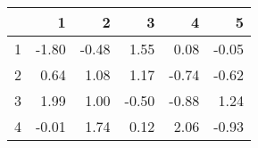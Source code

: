 \begin{table}[ht]
\centering
\begin{tabular}{rrrrrr}
  \hline
 & 1 & 2 & 3 & 4 & 5 \\ 
  \hline
1 & -1.80 & -0.48 & 1.55 & 0.08 & -0.05 \\ 
  2 & 0.64 & 1.08 & 1.17 & -0.74 & -0.62 \\ 
  3 & 1.99 & 1.00 & -0.50 & -0.88 & 1.24 \\ 
  4 & -0.01 & 1.74 & 0.12 & 2.06 & -0.93 \\ 
   \hline
\end{tabular}
\end{table}
